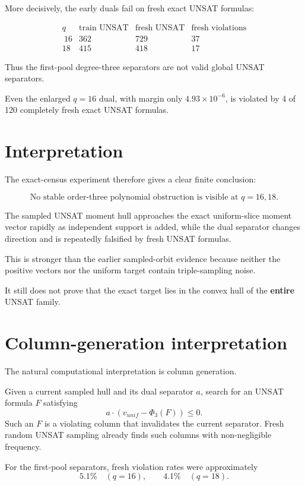\documentclass[11pt]{article}
\begin{document}
More decisively, the early duals fail on fresh exact UNSAT formulas:

\[
\begin{array}{c|c|c|c}
q & \text{train UNSAT} & \text{fresh UNSAT} &
\text{fresh violations} \\\
\hline
16 & 362 & 729 & 37\\
18 & 415 & 418 & 17
\end{array}
\]

Thus the first-pool degree-three separators are not valid global UNSAT
separators.

Even the enlarged \(q=16\) dual, with margin only
\(4.93\times10^{-6}\), is violated by 4 of 120 completely fresh exact UNSAT
formulas.

\section{Interpretation}

The exact-census experiment therefore gives a clear finite conclusion:

\[
\boxed{
\text{No stable order-three polynomial obstruction is visible at }q=16,18.
}
\]

The sampled UNSAT moment hull approaches the exact uniform-slice moment
vector rapidly as independent support is added, while the dual separator
changes direction and is repeatedly falsified by fresh UNSAT formulas.

This is stronger than the earlier sampled-orbit evidence because neither the
positive vectors nor the uniform target contain triple-sampling noise.

It still does not prove that the exact target lies in the convex hull of the
\textbf{entire} UNSAT family.

\section{Column-generation interpretation}

The natural computational interpretation is column generation.

Given a current sampled hull and its dual separator \(a\), search for an UNSAT
formula \(F\) satisfying
\[
a\cdot\left(v_{unif}-\Phi_3(F)\right)\le0.
\tag{2}
\]
Such an \(F\) is a violating column that invalidates the current separator.
Fresh random UNSAT sampling already finds such columns with non-negligible
frequency.

For the first-pool separators, fresh violation rates were approximately
\[
5.1\%
\quad(q=16),
\qquad
4.1\%
\quad(q=18).
\]
\end{document}
